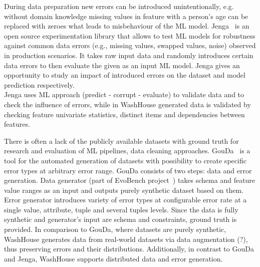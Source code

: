 During data preparation new errors can be introduced unintentionally, e.g. without domain knowledge missing values in feature with a person's age can be replaced with zeroes what leads to misbehaviour of the ML model.
Jenga~\cite{jenga} is an open source experimentation library that allows to test ML models for robustness against common data errors (e.g., missing values, swapped values, noise) observed in production scenarios.
It takes raw input data and randomly introduces certain data errors to then evaluate the given as an input ML model. Jenga gives an opportunity to study an impact of introduced errors on the dataset and model prediction respectively.\\
Jenga uses ML approach (predict - corrupt - evaluate) to validate data and to check the influence of errors, while in WashHouse generated data is validated by checking feature univariate statistics, distinct items and dependencies between features. 

There is often a lack of the publicly available datasets with ground truth for research and evaluation of ML pipelines, data cleaning approaches. 
GouDa~\cite{gouda} is a tool for the automated generation of datasets with possibility to create specific error types at arbitrary error range.
GouDa consists of two steps: data and error generation.
Data generator (part of EvoBench project~\cite{evobench}) takes schema and feature value ranges as an input and outputs purely synthetic dataset based on them. 
Error generator introduces variety of error types at configurable error rate at a single value, attribute, tuple and several tuples levels. Since the data is fully synthetic and generator's input are schema and constraints, ground truth is provided. 
In comparison to GouDa, where datasets are purely synthetic, WashHouse generates data from real-world datasets via data augmentation (?), thus preserving errors and their distributions. 
Additionally, in contrast to GouDa and Jenga, WashHouse supports distributed data and error generation.\\

